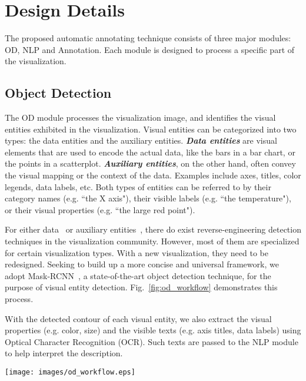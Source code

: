 \documentclass{vgtc}                          %
\begin{document}
\section{Design Details}

The proposed automatic annotating technique consists of three major modules: OD, NLP and Annotation. Each module is designed to process a specific part of the visualization.

\subsection{Object Detection}
The OD module processes the visualization image, and identifies the visual entities exhibited in the visualization. Visual entities can be categorized into two types: the data entities and the auxiliary entities. \textbf{\emph{Data entities}} are visual elements that are used to encode the actual data, like the bars in a bar chart, or the points in a scatterplot. \textbf{\emph{Auxiliary entities}}, on the other hand, often convey the visual mapping or the context of the data. Examples include axes, titles, color legends, data labels, etc. Both types of entities can be referred to by their category names (e.g. ``the X axis"), their visible labels (e.g. ``the temperature"), or their visual properties (e.g. ``the large red point").

For either data~\cite{DBLP:conf/chi/JungKSHLKS17} or auxiliary entities~\cite{DBLP:journals/tvcg/PocoMH18}, there do exist reverse-engineering detection techniques in the visualization community. However, most of them are specialized for certain visualization types. With a new visualization, they need to be redesigned. Seeking to build up a more concise and universal framework, we adopt Mask-RCNN~\cite{DBLP:conf/iccv/HeGDG17}, a state-of-the-art object detection technique, for the purpose of visual entity detection. Fig.~\ref{fig:od_workflow} demonstrates this process.

With the detected contour of each visual entity, we also extract the visual properties (e.g. color, size) and the visible texts (e.g. axis titles, data labels) using Optical Character Recognition (OCR). Such texts are passed to the NLP module to help interpret the description.

\begin{figure*}[t]
\begin{center}
 \texttt{[image: images/od\_workflow.eps]}
  \caption{The workflow of visual entity detection. We collect various types of a) visualization images and b) label the contours of visual entities for model training. The object detection model is able to return c) both the bounding box and the rough contour for each entity. d) We refine the contours so that they can be used for accurate annotating.}
  \label{fig:od_workflow}
\end{center}
\end{figure*}
\end{document}
